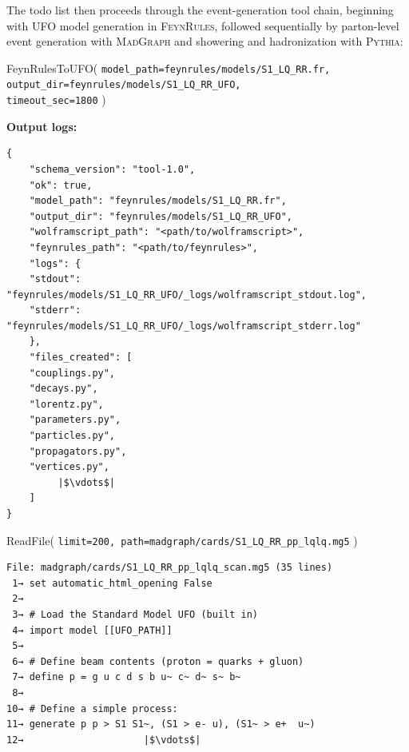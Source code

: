 \documentclass[11pt,oneside]{article}
\numberwithin{equation}{section}
\begin{document}
The todo list then proceeds through the event-generation tool chain, beginning with UFO model generation in \textsc{FeynRules}, followed sequentially by parton-level event generation with \textsc{MadGraph} and showering and hadronization with \textsc{Pythia}:
\begin{orchestralagentmessage}
    \begin{orchestraltoolmessageml}{FeynRulesToUFO( \texttt{model\_path=feynrules/models/S1\_LQ\_RR.fr,} \\\hphantom{FeynRulesToUFO(}
        \texttt{output\_dir=feynrules/models/S1\_LQ\_RR\_UFO,}\\\hphantom{FeynRulesToUFO(}
        \texttt{timeout\_sec=1800} )
    }

    \textbf{Output logs:} \vspace{-0.2in}
        \begin{verbatim}
{
    "schema_version": "tool-1.0",
    "ok": true,
    "model_path": "feynrules/models/S1_LQ_RR.fr",
    "output_dir": "feynrules/models/S1_LQ_RR_UFO",
    "wolframscript_path": "<path/to/wolframscript>",
    "feynrules_path": "<path/to/feynrules>",
    "logs": {
    "stdout": "feynrules/models/S1_LQ_RR_UFO/_logs/wolframscript_stdout.log",
    "stderr": "feynrules/models/S1_LQ_RR_UFO/_logs/wolframscript_stderr.log"
    },
    "files_created": [
    "couplings.py",
    "decays.py",
    "lorentz.py",
    "parameters.py",
    "particles.py",
    "propagators.py",
    "vertices.py",
         |$\vdots$|
    ]
}
        \end{verbatim}
    \end{orchestraltoolmessageml}


    \begin{orchestraltoolmessage}{ReadFile( \texttt{limit=200, path=madgraph/cards/S1\_LQ\_RR\_pp\_lqlq.mg5} )}
    \begin{verbatim}
File: madgraph/cards/S1_LQ_RR_pp_lqlq_scan.mg5 (35 lines)
 1→ set automatic_html_opening False
 2→ 
 3→ # Load the Standard Model UFO (built in)
 4→ import model [[UFO_PATH]]
 5→ 
 6→ # Define beam contents (proton = quarks + gluon)
 7→ define p = g u c d s b u~ c~ d~ s~ b~
 8→ 
10→ # Define a simple process:
11→ generate p p > S1 S1~, (S1 > e- u), (S1~ > e+  u~)
12→                     |$\vdots$|
    \end{verbatim}
    \end{orchestraltoolmessage}



\end{orchestralagentmessage}
\end{document}

